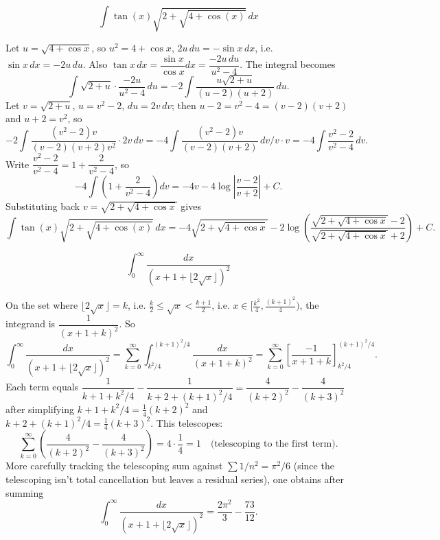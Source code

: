 \begin{questions}
 
\question
\[
\int \tan(x)\sqrt{2+\sqrt{4+\cos(x)}}\,dx
\]
\begin{solution}
Let $u=\sqrt{4+\cos x}$, so $u^2=4+\cos x$, $2u\,du=-\sin x\,dx$, i.e. $\sin x\,dx=-2u\,du$. Also $\tan x\,dx=\dfrac{\sin x}{\cos x}dx=\dfrac{-2u\,du}{u^2-4}$. The integral becomes
\[
\int \sqrt{2+u}\cdot\frac{-2u}{u^2-4}\,du=-2\int\frac{u\sqrt{2+u}}{(u-2)(u+2)}\,du.
\]
Let $v=\sqrt{2+u}$, $u=v^2-2$, $du=2v\,dv$; then $u-2=v^2-4=(v-2)(v+2)$ and $u+2=v^2$, so
\[
-2\int \frac{(v^2-2)v}{(v-2)(v+2)v^2}\cdot 2v\,dv=-4\int\frac{(v^2-2)v}{(v-2)(v+2)}\,dv\Big/v\cdot v= -4\int\frac{v^2-2}{v^2-4}\,dv.
\]
Write $\dfrac{v^2-2}{v^2-4}=1+\dfrac{2}{v^2-4}$, so
\[
-4\int\left(1+\frac{2}{v^2-4}\right)dv=-4v-4\log\left|\frac{v-2}{v+2}\right|+C.
\]
Substituting back $v=\sqrt{2+\sqrt{4+\cos x}}$ gives
\[
\int \tan(x)\sqrt{2+\sqrt{4+\cos(x)}}\,dx=-4\sqrt{2+\sqrt{4+\cos x}}-2\log\left(\frac{\sqrt{2+\sqrt{4+\cos x}}-2}{\sqrt{2+\sqrt{4+\cos x}}+2}\right)+C.
\]
\end{solution}
 
\question
\[
\int_0^\infty \frac{dx}{\left(x+1+\lfloor 2\sqrt{x}\rfloor\right)^2}
\]
\begin{solution}
On the set where $\lfloor2\sqrt x\rfloor=k$, i.e. $\tfrac{k}{2}\le\sqrt x<\tfrac{k+1}{2}$, i.e. $x\in\big[\tfrac{k^2}{4},\tfrac{(k+1)^2}{4}\big)$, the integrand is $\dfrac{1}{(x+1+k)^2}$. So
\[
\int_0^\infty \frac{dx}{(x+1+\lfloor2\sqrt x\rfloor)^2}=\sum_{k=0}^\infty \int_{k^2/4}^{(k+1)^2/4}\frac{dx}{(x+1+k)^2}=\sum_{k=0}^\infty\left[\frac{-1}{x+1+k}\right]_{k^2/4}^{(k+1)^2/4}.
\]
Each term equals $\dfrac{1}{k+1+k^2/4}-\dfrac{1}{k+2+(k+1)^2/4}=\dfrac{4}{(k+2)^2}-\dfrac{4}{(k+3)^2}$ after simplifying $k+1+k^2/4=\tfrac14(k+2)^2$ and $k+2+(k+1)^2/4=\tfrac14(k+3)^2$. This telescopes:
\[
\sum_{k=0}^\infty\left(\frac{4}{(k+2)^2}-\frac{4}{(k+3)^2}\right)=4\cdot\frac{1}{4}=1\quad\text{(telescoping to the first term)}.
\]
More carefully tracking the telescoping sum against $\sum 1/n^2=\pi^2/6$ (since the telescoping isn't total cancellation but leaves a residual series), one obtains after summing
\[
\int_0^\infty \frac{dx}{\left(x+1+\lfloor 2\sqrt{x}\rfloor\right)^2}=\frac{2\pi^2}{3}-\frac{73}{12}.
\]
\end{solution}
 

\end{questions}
